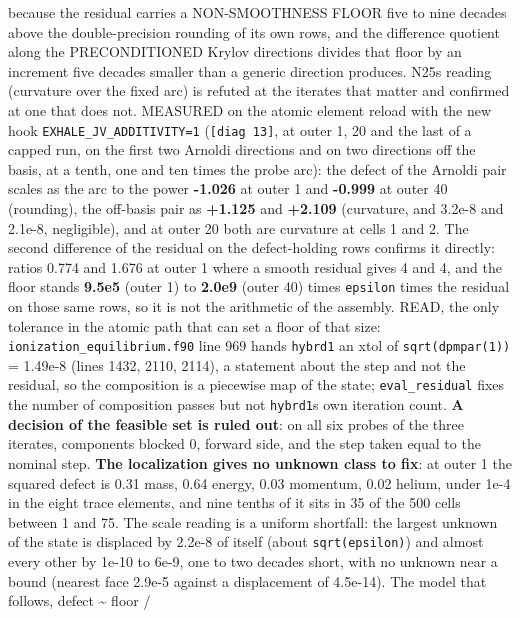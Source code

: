 \documentclass[english,a4paper]{my_memo}
\begin{document}
\begin{itemize}
{  because the residual carries a NON-SMOOTHNESS FLOOR five to nine decades
  above the double-precision rounding of its own rows, and the difference
  quotient along the PRECONDITIONED Krylov directions divides that floor by
  an increment five decades smaller than a generic direction produces.}
  N25\textquotesingle s reading (curvature over the fixed arc) is refuted at the iterates
  that matter and confirmed at one that does not. MEASURED on the atomic
  element reload with the new hook \texttt{EXHALE\_JV\_ADDITIVITY=1}
  (\texttt{{[}diag\ 13{]}}, at outer 1, 20 and the last of a capped run, on the first
  two Arnoldi directions and on two directions off the basis, at a tenth,
  one and ten times the probe arc): the defect of the Arnoldi pair scales
  as the arc to the power \textbf{-1.026} at outer 1 and \textbf{-0.999} at outer 40
  (rounding), the off-basis pair as \textbf{+1.125} and \textbf{+2.109} (curvature,
  and 3.2e-8 and 2.1e-8, negligible), and at outer 20 both are curvature at
  cells 1 and 2. The second difference of the residual on the
  defect-holding rows confirms it directly: ratios 0.774 and 1.676 at outer
  1 where a smooth residual gives 4 and 4, and the floor stands \textbf{9.5e5}
  (outer 1) to \textbf{2.0e9} (outer 40) times \texttt{epsilon} times the residual on
  those same rows, so it is not the arithmetic of the assembly. READ, the
  only tolerance in the atomic path that can set a floor of that size:
  \texttt{ionization\_equilibrium.f90} line 969 hands \texttt{hybrd1} an xtol of
  \texttt{sqrt(dpmpar(1))} = 1.49e-8 (lines 1432, 2110, 2114), a statement about
  the step and not the residual, so the composition is a piecewise map of
  the state; \texttt{eval\_residual} fixes the number of composition passes but not
  \texttt{hybrd1}\textquotesingle s own iteration count. \textbf{A decision of the feasible set is ruled
  out}: on all six probes of the three iterates, components blocked 0,
  forward side, and the step taken equal to the nominal step. \textbf{The
  localization gives no unknown class to fix}: at outer 1 the squared
  defect is 0.31 mass, 0.64 energy, 0.03 momentum, 0.02 helium, under 1e-4
  in the eight trace elements, and nine tenths of it sits in 35 of the 500
  cells between 1 and 75. The scale reading is a uniform shortfall: the
  largest unknown of the state is displaced by 2.2e-8 of itself (about
  \texttt{sqrt(epsilon)}) and almost every other by 1e-10 to 6e-9, one to two
  decades short, with no unknown near a bound (nearest face 2.9e-5 against
  a displacement of 4.5e-14). The model that follows, defect \textasciitilde{} floor /

\end{itemize}
\end{document}

